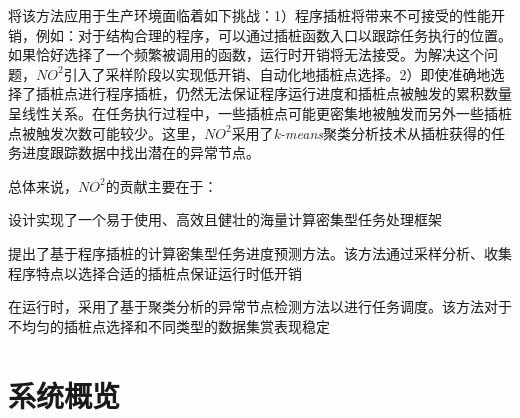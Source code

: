 将该方法应用于生产环境面临着如下挑战：1）程序插桩将带来不可接受的性能开销，例如：对于结构合理的程序，可以通过插桩函数入口以跟踪任务执行的位置。如果恰好选择了一个频繁被调用的函数，运行时开销将无法接受。为解决这个问题，$NO^2$引入了采样阶段以实现低开销、自动化地插桩点选择。2）即使准确地选择了插桩点进行程序插桩，仍然无法保证程序运行进度和插桩点被触发的累积数量呈线性关系。在任务执行过程中，一些插桩点可能更密集地被触发而另外一些插桩点被触发次数可能较少。这里，$NO^2$采用了\emph{k-means}聚类分析技术从插桩获得的任务进度跟踪数据中找出潜在的异常节点。

总体来说，$NO^2$的贡献主要在于：

设计实现了一个易于使用、高效且健壮的海量计算密集型任务处理框架

提出了基于程序插桩的计算密集型任务进度预测方法。该方法通过采样分析、收集程序特点以选择合适的插桩点保证运行时低开销

在运行时，采用了基于聚类分析的异常节点检测方法以进行任务调度。该方法对于不均匀的插桩点选择和不同类型的数据集赏表现稳定

\section{系统概览}
\label{sec:no2_overview}
